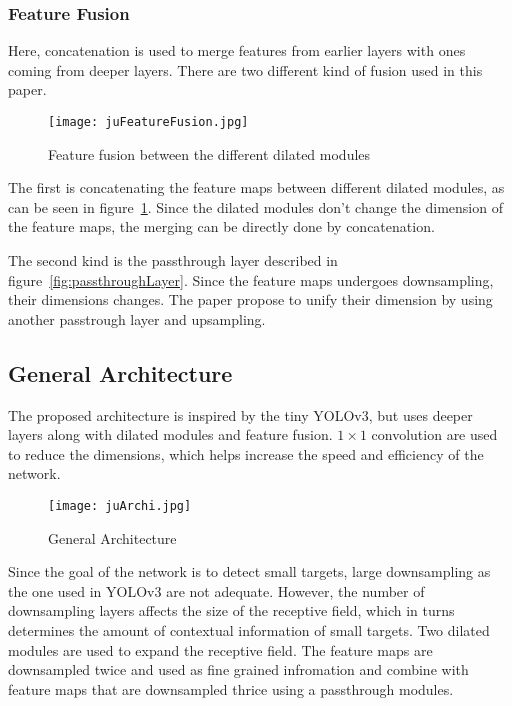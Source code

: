 \subsubsection{Feature Fusion}
Here, concatenation is used to merge features from earlier layers with ones coming from deeper layers. There are two different kind of fusion used in this paper. 

\begin{figure}[h!]
	\centering
	\texttt{[image: juFeatureFusion.jpg]}
	\caption[Feature fusion between the dilated modules in the Simple Detection Network for Small Object Detection]{Feature fusion between the different dilated modules}
	\label{fig:featureFusionDilMol}
\end{figure}

The first is concatenating the feature maps between different dilated modules, as can be seen in figure~\ref{fig:featureFusionDilMol}. Since the dilated modules don't change the dimension of the feature maps, the merging can be directly done by concatenation.

The second kind is the passthrough layer described in figure~\ref{fig:passthroughLayer}. Since the feature maps undergoes downsampling, their dimensions changes. The paper propose to unify their dimension by using another passtrough layer and upsampling. 

\subsection{General Architecture} 
The proposed architecture is inspired by the tiny YOLOv3, but uses deeper layers along with dilated modules and feature fusion. $1 \times 1$ convolution are used to reduce the dimensions, which helps increase the speed and efficiency of the network.


\begin{figure}[h!]
	\centering
	\texttt{[image: juArchi.jpg]}
	\caption[General Architecture for the Simple and Efficient Network for Small Target Detection]{General Architecture}
	\label{}
\end{figure}

Since the goal of the network is to detect small targets, large downsampling as the one used in YOLOv3 are not adequate. However, the number of downsampling layers affects the size of the receptive field, which in turns determines the amount of contextual information of small targets. Two dilated modules are used to expand the receptive field. The feature maps are downsampled twice and used as fine grained infromation and combine with feature maps that are downsampled thrice using a passthrough modules. 

